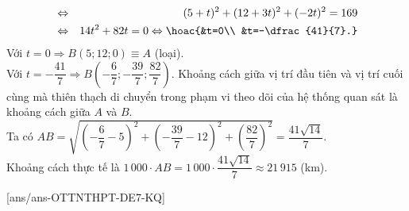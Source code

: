 \begin{ex}
{\begin{itemchoice}
\begin{eqnarray*}
					&\Leftrightarrow &(5+t)^2+(12+3t)^2+(-2t)^2=169\\
					&\Leftrightarrow & 14 t^2+82 t=0 \Leftrightarrow \hoac{&t=0\\
						&t=-\dfrac{41}{7}.}
				\end{eqnarray*}
				Với $t=0\Rightarrow B(5;12;0)\equiv A$ (loại).\\
				Với $t=-\dfrac{41}{7}\Rightarrow B\left(-\dfrac{6}{7};-\dfrac{39}{7}; \dfrac{82}{7}\right)$.
				\itemch Khoảng cách giữa vị trí đầu tiên và vị trí cuối cùng mà thiên thạch di chuyển trong phạm vi theo dõi của hệ thống quan sát là khoảng cách giữa $A$ và $B$.\\
				Ta có $AB=\sqrt{\left(-\dfrac{6}{7}-5\right)^2+\left(-\dfrac{39}{7}-12\right)^2+\left(\dfrac{82}{7}\right)^2}=\dfrac{41\sqrt{14}}{7}$.\\
				Khoảng cách thực tế là $1\,000\cdot AB=1\,000\cdot \dfrac{41\sqrt{14}}{7} \approx 21\,915$ (km).
				\end{itemchoice}
			}
\end{ex}
[ans/ans-OTTNTHPT-DE7-KQ]
\caukq
